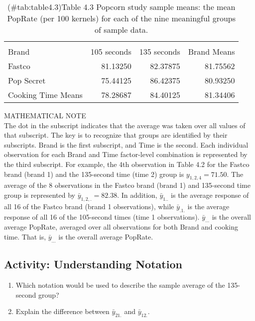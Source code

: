 \documentclass[
]{report}
\providecommand{\tightlist}{%
  \setlength{\itemsep}{0pt}\setlength{\parskip}{0pt}}
\theoremstyle{definition}
\theoremstyle{definition}
\theoremstyle{definition}
\theoremstyle{definition}
\theoremstyle{remark}
\begin{document}
\begin{table}

\caption{(\#tab:table4.3)Table 4.3 Popcorn study sample means: the mean PopRate (per 100 kernels) for each of the nine meaningful groups of sample data.}
\centering
\begin{tabular}[t]{lrrr}
\toprule
{} &  &  \\
\cmidrule(l{3pt}r{3pt}){2-3}
Brand & 105 seconds & 135 seconds & Brand Means\\
\midrule
Fastco & 81.13250 & 82.37875 & 81.75562\\
Pop Secret & 75.44125 & 86.42375 & 80.93250\\
Cooking Time Means & 78.28687 & 84.40125 & 81.34406\\
\bottomrule
\end{tabular}
\end{table}

MATHEMATICAL NOTE\\
The dot in the subscript indicates that the average was taken over all values of that subscript. The key is to recognize that groups are identified by their subscripts. Brand is the first subscript, and Time is the second. Each individual observation for each Brand and Time factor-level combination is represented by the third subscript. For example, the 4th observation in Table 4.2 for the Fastco brand (brand 1) and the 135-second time (time 2) group is \(y_{1,2,4} = 71.50\). The average of the 8 observations in the Fastco brand (brand 1) and 135-second time group is represented by \(\bar y_{1,2,.} = 82.38\). In addition, \(\bar y_{1..}\) is the average response of all 16 of the Fastco brand (brand 1 observations), while \(\bar y_{.1.}\) is the average response of all 16 of the 105-second times (time 1 observations). \(\bar y_{...}\) is the overall average PopRate, averaged over all observations for both Brand and cooking time. That is, \(\bar y_{...}\) is the overall average PopRate.

\hypertarget{activity-understanding-notation}{%
\subsection{Activity: Understanding Notation}\label{activity-understanding-notation}}

\begin{enumerate}
\def\labelenumi{\arabic{enumi}.}
\setcounter{enumi}{5}
\tightlist
\item
  Which notation would be used to describe the sample average of the 135-second group?
\item
  Explain the difference between \(\bar y_{21.}\) and \(\bar y_{12.}\).
\end{enumerate}
\end{document}
